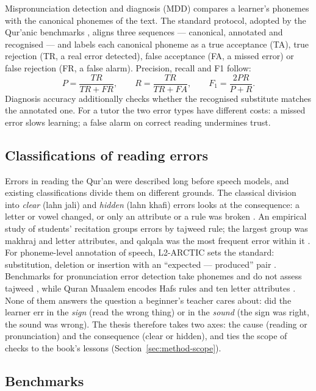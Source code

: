 Mispronunciation detection and diagnosis (MDD) compares a learner's phonemes with the canonical phonemes
of the text. The standard protocol, adopted by the Qur'anic
benchmarks \cite{SRC-004,SRC-031,SRC-066}, aligns three sequences --- canonical, annotated and recognised ---
and labels each canonical phoneme as a true acceptance (TA), true rejection (TR, a real error detected), false
acceptance (FA, a missed error) or false rejection (FR, a false alarm). Precision, recall and F1 follow:
\begin{equation}
  P = \frac{TR}{TR+FR},\qquad R = \frac{TR}{TR+FA},\qquad F_1 = \frac{2PR}{P+R}.
\end{equation}
Diagnosis accuracy additionally checks whether the recognised substitute matches the annotated one. For a
tutor the two error types have different costs: a missed error slows learning; a false alarm on correct
reading undermines trust.

\subsection{Classifications of reading errors}

Errors in reading the Qur'an were described long before speech models, and existing classifications divide them on
different grounds. The classical division into \emph{clear} (lahn jali) and \emph{hidden} (lahn khafi) errors looks
at the consequence: a letter or vowel changed, or only an attribute or a rule was broken \cite{SRC-153}. An
empirical study of students' recitation groups errors by tajweed rule; the largest group was makhraj and letter
attributes, and qalqala was the most frequent error within it \cite{SRC-152}. For phoneme-level annotation of speech,
L2-ARCTIC sets the standard: substitution, deletion or insertion with an ``expected --- produced'' pair
\cite{SRC-154}. Benchmarks for pronunciation error detection take phonemes and do not assess tajweed
\cite{SRC-004}, while Quran Muaalem encodes Hafs rules and ten letter attributes \cite{SRC-002}. None of them
answers the question a beginner's teacher cares about: did the learner err in the \emph{sign} (read the wrong
thing) or in the \emph{sound} (the sign was right, the sound was wrong). The thesis therefore takes two axes: the
cause (reading or pronunciation) and the consequence (clear or hidden), and ties the scope of checks to the
book's lessons (Section~\ref{sec:method-scope}).

\subsection{Benchmarks}

